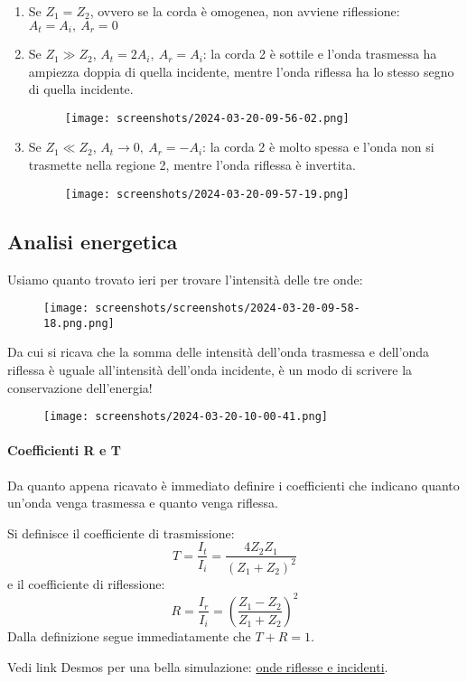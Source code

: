 \begin{enumerate}
	\item Se \(Z_1 = Z_2\), ovvero se la corda è omogenea, non avviene riflessione: \(A_t = A_i,\ A_r = 0\) 
	\item Se \(Z_1 \gg Z_2\), \(A_t = 2A_i,\ A_r=A_i\): la corda 2 è sottile e l'onda trasmessa ha ampiezza doppia di quella incidente, mentre l'onda riflessa ha lo stesso segno di quella incidente.  
	\begin{figure}[H]
		\centering
		\texttt{[image: screenshots/2024-03-20-09-56-02.png]}
	\end{figure}
	\item Se \(Z_1 \ll Z_2\), \(A_t \to 0,\ A_r = -A_i\): la corda 2 è molto spessa e l'onda non si trasmette nella regione 2, mentre l'onda riflessa è invertita.
	\begin{figure}[H]
		\centering
		\texttt{[image: screenshots/2024-03-20-09-57-19.png]}
	\end{figure}  
\end{enumerate}
\subsection{Analisi energetica}
Usiamo quanto trovato ieri per trovare l'intensità delle tre onde:
\begin{figure}[H]
	\centering
	\texttt{[image: screenshots/screenshots/2024-03-20-09-58-18.png.png]}
\end{figure}
Da cui si ricava che la somma delle intensità dell'onda trasmessa e dell'onda riflessa è uguale all'intensità dell'onda incidente, è un modo di scrivere la conservazione dell'energia!
\begin{figure}[H]
	\centering
	\texttt{[image: screenshots/2024-03-20-10-00-41.png]}
\end{figure}
\paragraph{Coefficienti R e T}
Da quanto appena ricavato è immediato definire i coefficienti che indicano quanto un'onda venga trasmessa e quanto venga riflessa.
\begin{definition}
	Si definisce il coefficiente di trasmissione:
	\[
		T= \frac{I_t}{I_i} = \frac{4Z_2 Z_1}{(Z_1 +Z_2)^{2} }
	\]
	e il coefficiente di riflessione:
	\[
		R= \frac{I_r}{I_i}=\left( \frac{Z_1 - Z_2}{Z_1 + Z_2} \right) ^{2} 
	\]
	Dalla definizione segue immediatamente che \(T+R=1\).
\end{definition}
Vedi link Desmos per una bella simulazione: \href{https://www.desmos.com/calculator/42zmaoac6h?lang=it}{onde riflesse e incidenti}.

